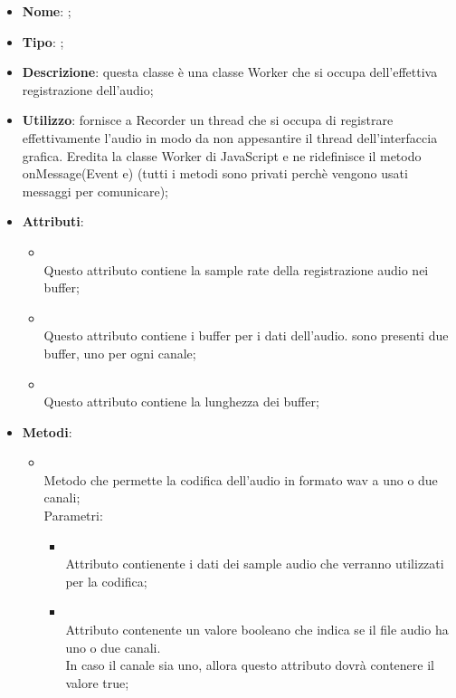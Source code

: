 \begin{itemize}
	\item \textbf{Nome}: ;
	\item \textbf{Tipo}: ;
	\item \textbf{Descrizione}: questa classe è una classe Worker che si occupa dell'effettiva registrazione dell'audio;
	\item \textbf{Utilizzo}: fornisce a Recorder un thread che si occupa di registrare effettivamente l'audio in modo da non appesantire il thread dell'interfaccia grafica.
Eredita la classe Worker di JavaScript e ne ridefinisce il metodo onMessage(Event e)  (tutti i metodi sono privati perchè vengono usati messaggi per comunicare);

	\item \textbf{Attributi}:
	\begin{itemize}
		\item[]  \\
		Questo attributo contiene la sample rate della registrazione audio nei buffer;
		\item[]  \\
		Questo attributo contiene i buffer per i dati dell'audio. sono presenti due buffer, uno per ogni canale;
		\item[]  \\
		Questo attributo contiene la lunghezza dei buffer;
	\end{itemize}
	\item \textbf{Metodi}:
	\begin{itemize}
		\item[]  \\
		Metodo che permette la codifica dell'audio in formato wav a uno o due canali;\\
		Parametri:
		\begin{itemize}
			\item {} \\
			Attributo contienente i dati dei sample audio che verranno utilizzati per la codifica;
			\item {} \\
			Attributo contenente un valore booleano che indica se il file audio ha uno o due canali. \\
In caso il canale sia uno, allora questo attributo dovrà contenere il valore true;
		\end{itemize}

\end{itemize}
\end{itemize}
